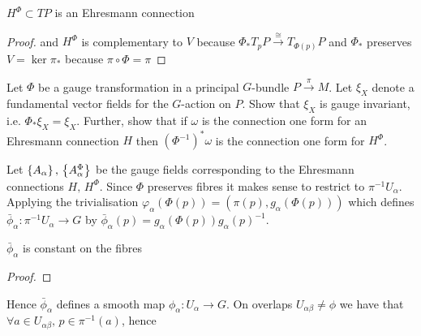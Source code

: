 \documentclass{article}
\begin{document}
\begin{lemma}
	$H^\Phi \subset TP$ is an Ehresmann connection
\end{lemma}
\begin{proof}
	and $H^\Phi$ is complementary to $V$ because $\Phi_\ast T_pP \overset{\cong}{\to} T_{\Phi(p)}P$ and $\Phi_\ast$ preserves $V = \ker \pi_\ast$ because $\pi\circ\Phi=\pi$
\end{proof}

\begin{ex}
	Let $\Phi$ be a gauge transformation in a principal $G$-bundle $P\overset{\pi}{\to}M$. Let $\xi_X$ denote a fundamental vector fields for the $G$-action on $P$. Show that $\xi_X$ is gauge invariant, i.e. $\Phi_\ast \xi_X = \xi_X$. Further, show that if $\omega$ is the connection one form for an Ehresmann connection $H$ then $(\Phi^{-1})^\ast \omega$ is the connection one form for $H^\Phi$. 
\end{ex}

Let $\left\{ A_\alpha \right\}, \, \left\{ A_\alpha^\Phi \right\}$ be the gauge fields corresponding to the Ehresmann connections $H, \, H^\Phi$. Since $\Phi$ preserves fibres it makes sense to restrict to $\pi^{-1}U_\alpha$. Applying the trivialisation $\varphi_\alpha(\Phi(p)) = (\pi(p),g_\alpha(\Phi(p)))$ which defines $\bar{\phi}_\alpha : \pi^{-1} U_\alpha \to G$ by $\bar{\phi}_\alpha(p)=g_\alpha(\Phi(p))g_\alpha(p)^{-1}$. \\

\begin{lemma}
	$\bar{\phi}_\alpha$ is constant on the fibres
\end{lemma}
\begin{proof}
\end{proof}
Hence $\bar{\phi}_\alpha$ defines a smooth map $\phi_\alpha:U_\alpha \to G$. On overlaps $U_{\alpha\beta}\neq \phi$ we have that $\forall a \in U_{\alpha\beta}, \, p \in \pi^{-1}(a)$, hence 
\end{document}
